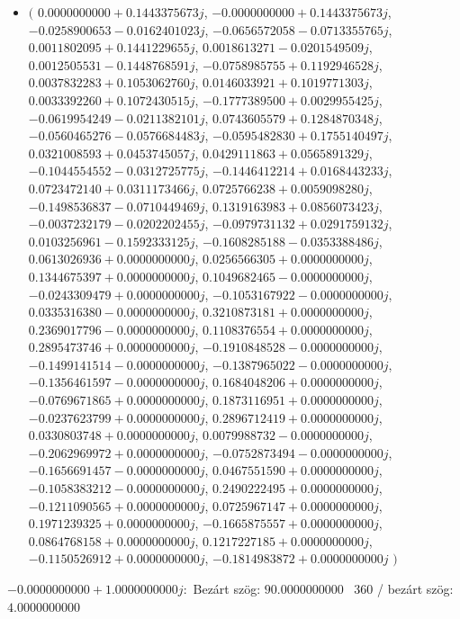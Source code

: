 \documentclass[14pt,a4paper]{article}
\begin{document}
\begin{itemize}
\item
$\big($
$0.0000000000+0.1443375673j$, $-0.0000000000+0.1443375673j$, $-0.0258900653-0.0162401023j$, $-0.0656572058-0.0713355765j$, $0.0011802095+0.1441229655j$, $0.0018613271-0.0201549509j$, $0.0012505531-0.1448768591j$, $-0.0758985755+0.1192946528j$, $0.0037832283+0.1053062760j$, $0.0146033921+0.1019771303j$, $0.0033392260+0.1072430515j$, $-0.1777389500+0.0029955425j$, $-0.0619954249-0.0211382101j$, $0.0743605579+0.1284870348j$, $-0.0560465276-0.0576684483j$, $-0.0595482830+0.1755140497j$, $0.0321008593+0.0453745057j$, $0.0429111863+0.0565891329j$, $-0.1044554552-0.0312725775j$, $-0.1446412214+0.0168443233j$, $0.0723472140+0.0311173466j$, $0.0725766238+0.0059098280j$, $-0.1498536837-0.0710449469j$, $0.1319163983+0.0856073423j$, $-0.0037232179-0.0202202455j$, $-0.0979731132+0.0291759132j$, $0.0103256961-0.1592333125j$, $-0.1608285188-0.0353388486j$, $0.0613026936+0.0000000000j$, $0.0256566305+0.0000000000j$, $0.1344675397+0.0000000000j$, $0.1049682465-0.0000000000j$, $-0.0243309479+0.0000000000j$, $-0.1053167922-0.0000000000j$, $0.0335316380-0.0000000000j$, $0.3210873181+0.0000000000j$, $0.2369017796-0.0000000000j$, $0.1108376554+0.0000000000j$, $0.2895473746+0.0000000000j$, $-0.1910848528-0.0000000000j$, $-0.1499141514-0.0000000000j$, $-0.1387965022-0.0000000000j$, $-0.1356461597-0.0000000000j$, $0.1684048206+0.0000000000j$, $-0.0769671865+0.0000000000j$, $0.1873116951+0.0000000000j$, $-0.0237623799+0.0000000000j$, $0.2896712419+0.0000000000j$, $0.0330803748+0.0000000000j$, $0.0079988732-0.0000000000j$, $-0.2062969972+0.0000000000j$, $-0.0752873494-0.0000000000j$, $-0.1656691457-0.0000000000j$, $0.0467551590+0.0000000000j$, $-0.1058383212-0.0000000000j$, $0.2490222495+0.0000000000j$, $-0.1211090565+0.0000000000j$, $0.0725967147+0.0000000000j$, $0.1971239325+0.0000000000j$, $-0.1665875557+0.0000000000j$, $0.0864768158+0.0000000000j$, $0.1217227185+0.0000000000j$, $-0.1150526912+0.0000000000j$, $-0.1814983872+0.0000000000j$
$\big)$
\end{itemize}
$-0.0000000000+1.0000000000j$:\
Bezárt szög: $90.0000000000$ \
360 / bezárt szög: $4.0000000000$\
\end{document}
